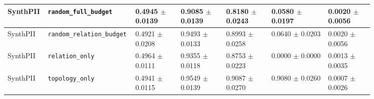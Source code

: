 \documentclass[preprint,12pt]{elsarticle}
\begin{document}
\begin{landscape}
\begin{longtable}{|L{0.07\linewidth}|L{0.15\linewidth}|C{0.12\linewidth}|C{0.12\linewidth}|C{0.12\linewidth}|C{0.15\linewidth}|C{0.12\linewidth}|}
SynthPII & \nolinkurl{random_full_budget} & 0.4945 $\pm$ 0.0139 & 0.9085 $\pm$ 0.0139 & 0.8180 $\pm$ 0.0243 & 0.0580 $\pm$ 0.0197 & 0.0020 $\pm$ 0.0056 \\ \hline
SynthPII & \nolinkurl{random_relation_budget} & 0.4921 $\pm$ 0.0208 & 0.9493 $\pm$ 0.0133 & 0.8993 $\pm$ 0.0258 & 0.0640 $\pm$ 0.0203 & 0.0020 $\pm$ 0.0056 \\ \hline
SynthPII & \nolinkurl{relation_only} & 0.4964 $\pm$ 0.0111 & 0.9355 $\pm$ 0.0118 & 0.8753 $\pm$ 0.0223 & 0.0000 $\pm$ 0.0000 & 0.0013 $\pm$ 0.0035 \\ \hline
SynthPII & \nolinkurl{topology_only} & 0.4941 $\pm$ 0.0115 & 0.9549 $\pm$ 0.0139 & 0.9087 $\pm$ 0.0270 & 0.9080 $\pm$ 0.0260 & 0.0007 $\pm$ 0.0026 \\ \hline
\end{longtable}
\endgroup
\end{landscape}
\end{document}
